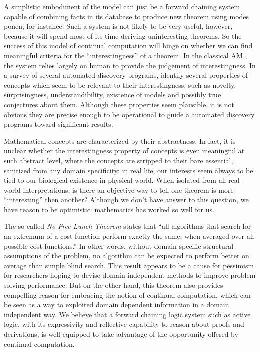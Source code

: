 A simplistic embodiment of the model can just be a forward chaining system
capable of combining facts in its database to produce new theorem using
modes ponen, for instance.  Such a system is not likely to be very useful,
however, because it will spend most of its time deriving uninteresting
theorems.  So the success of this model of continual computation will hinge
on whether we can find meaningful criteria for the ``interestingness'' of a
theorem.  In the classical AM
\cite{lenat1982:am,lenat1983:theory_formation,lenat/brown1984:why_am}, the
system relies largely on human to provide the judgement of interestingness.
In a survey of several automated discovery programs,
\cite{colton/bundy1999:notion_interestingness} identify several properties
of concepts which seem to be relevant to their interestingness, such as
novelty, surprisingness, understandibility, existence of models and
possibly true conjectures about them.  Although these properties seem
plausible, it is not obvious they are precise enough to be operational to
guide a automated discovery programs toward significant results.

Mathematical concepts are characterized by their abstractness.  In fact, it
is unclear whether the interestingness property of concepts is even
meaningful at such abstract level, where the concepts are stripped to their
bare essential, sanitized from any domain specificity: in real life, our
interests seem always to be tied to our biological existence in physical
world.  When isolated from all real-world interpretations, is there an
objective way to tell one theorem is more ``interesting'' then another?
Although we don't have answer to this question, we have reason to be
optimistic: mathematics has worked so well for us.


The so called \emph{No Free Lunch Theorem}
\cite{wolpert/macready1995:no_free,wolpert/macready1997:no_free} states
that ``all algorithms that search for an extremum of a cost function
perform exactly the same, when averaged over all possible cost functions.''
In other words, without domain specific structural assumptions of the
problem, no algorithm can be expected to perform better on average than
simple blind search.  This result appears to be a cause for pessimism for
researchers hoping to devise domain-independent methods to improve
problem solving performance.  But on the other hand, this theorem also
provides compelling reason for embracing the notion of continual
computation, which can be seen as a way to exploited domain dependent
information in a domain independent way.  We believe that a forward
chaining logic system such as active logic, with its expressivity and
reflective capability to reason about proofs and derivations, is
well-equipped to take advantage of the opportunity offered by continual
computation.
